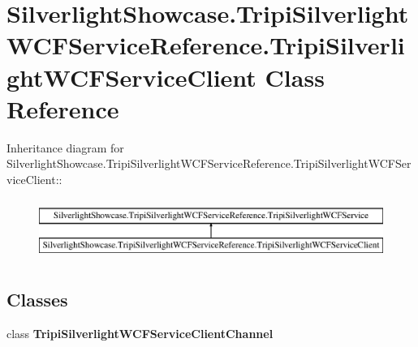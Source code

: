 \hypertarget{class_silverlight_showcase_1_1_tripi_silverlight_w_c_f_service_reference_1_1_tripi_silverlight_w_c_f_service_client}{
\section{SilverlightShowcase.TripiSilverlightWCFServiceReference.TripiSilverlightWCFServiceClient Class Reference}
\label{class_silverlight_showcase_1_1_tripi_silverlight_w_c_f_service_reference_1_1_tripi_silverlight_w_c_f_service_client}
}
Inheritance diagram for SilverlightShowcase.TripiSilverlightWCFServiceReference.TripiSilverlightWCFServiceClient::\begin{figure}[H]
\begin{center}
\leavevmode
\includegraphics[height=2cm]{class_silverlight_showcase_1_1_tripi_silverlight_w_c_f_service_reference_1_1_tripi_silverlight_w_c_f_service_client}
\end{center}
\end{figure}
\subsection*{Classes}
\begin{DoxyCompactItemize}
\item 
class {\bfseries TripiSilverlightWCFServiceClientChannel}
\end{DoxyCompactItemize}
